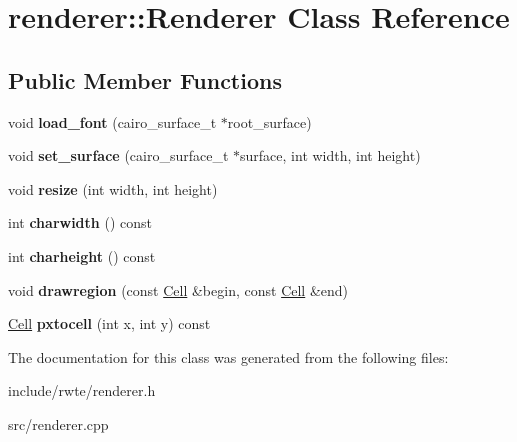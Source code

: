 \hypertarget{classrenderer_1_1Renderer}{}\section{renderer\+::Renderer Class Reference}
\label{classrenderer_1_1Renderer}
\subsection*{Public Member Functions}
\begin{DoxyCompactItemize}
\item 
\mbox{\label{classrenderer_1_1Renderer_af6b98cc451797b2229d84ad690e12e33}} 
void {\bfseries load\+\_\+font} (cairo\+\_\+surface\+\_\+t $\ast$root\+\_\+surface)
\item 
\mbox{\label{classrenderer_1_1Renderer_afa52f45e4899e66ab4490c8713903234}} 
void {\bfseries set\+\_\+surface} (cairo\+\_\+surface\+\_\+t $\ast$surface, int width, int height)
\item 
\mbox{\label{classrenderer_1_1Renderer_aa629af9b1594055c724cc3a0bf7cd0c1}} 
void {\bfseries resize} (int width, int height)
\item 
\mbox{\label{classrenderer_1_1Renderer_aebcaad640f8bd0c20f4967564db56795}} 
int {\bfseries charwidth} () const
\item 
\mbox{\label{classrenderer_1_1Renderer_a3a82fe96dc66304385818862de58beb3}} 
int {\bfseries charheight} () const
\item 
\mbox{\label{classrenderer_1_1Renderer_a37871922af0ba7709d8035e953f81697}} 
void {\bfseries drawregion} (const \mbox{\hyperlink{structCell}{Cell}} \&begin, const \mbox{\hyperlink{structCell}{Cell}} \&end)
\item 
\mbox{\label{classrenderer_1_1Renderer_ad3b8263d2c2b2041512e24d5c5cda21c}} 
\mbox{\hyperlink{structCell}{Cell}} {\bfseries pxtocell} (int x, int y) const
\end{DoxyCompactItemize}


The documentation for this class was generated from the following files\+:\begin{DoxyCompactItemize}
\item 
include/rwte/renderer.\+h\item 
src/renderer.\+cpp\end{DoxyCompactItemize}
